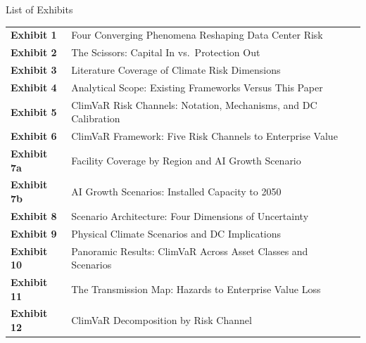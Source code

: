 \clearpage\thispagestyle{chapterstart}
\enlargethispage{10mm}

\vspace*{-8mm}
{\displayfont\fontsize{28}{32}\selectfont\color{SEGreen}List of Exhibits\par}
\vspace{6mm}

{\fontsize{9.5}{14}\selectfont\renewcommand{\arraystretch}{1.62}%
\begin{tabularx}{\textwidth}{@{} >{\color{SEGreen}\bfseries}l @{\hspace{8pt}} X @{\hspace{6pt}} r @{}}
  Exhibit 1  & Four Converging Phenomena Reshaping Data Center Risk & \textbf{\pageref{exh:1}} \\
  Exhibit 2  & The Scissors: Capital In vs.\ Protection Out & \textbf{\pageref{exh:2}} \\
  Exhibit 3  & Literature Coverage of Climate Risk Dimensions & \textbf{\pageref{exh:3}} \\
  Exhibit 4  & Analytical Scope: Existing Frameworks Versus This Paper & \textbf{\pageref{exh:4}} \\
  Exhibit 5  & ClimVaR Risk Channels: Notation, Mechanisms, and DC Calibration & \textbf{\pageref{exh:5}} \\
  Exhibit 6  & ClimVaR Framework: Five Risk Channels to Enterprise Value & \textbf{\pageref{exh:6}} \\
  Exhibit 7a & Facility Coverage by Region and AI Growth Scenario & \textbf{\pageref{exh:7a}} \\
  Exhibit 7b & AI Growth Scenarios: Installed Capacity to 2050 & \textbf{\pageref{exh:7b}} \\
  Exhibit 8  & Scenario Architecture: Four Dimensions of Uncertainty & \textbf{\pageref{exh:8}} \\
  Exhibit 9  & Physical Climate Scenarios and DC Implications & \textbf{\pageref{exh:9}} \\
  Exhibit 10 & Panoramic Results: ClimVaR Across Asset Classes and Scenarios & \textbf{\pageref{exh:10}} \\
  Exhibit 11 & The Transmission Map: Hazards to Enterprise Value Loss & \textbf{\pageref{exh:11}} \\
  Exhibit 12 & ClimVaR Decomposition by Risk Channel & \textbf{\pageref{exh:12}} \\

\end{tabularx}}
